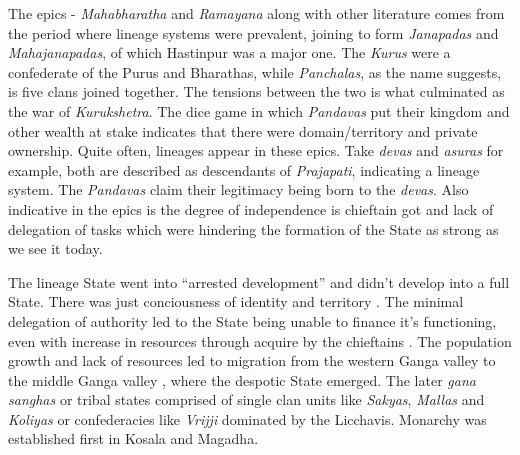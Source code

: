 \documentclass[a4paper]{article}
\begin{document}
The epics - \textit{Mahabharatha} and \textit{Ramayana} along with other
literature comes from the period where lineage systems were prevalent,
joining to form \textit{Janapadas} and \textit{Mahajanapadas}, of which
Hastinpur was a major one.  The \textit{Kurus} were a confederate of the
Purus and Bharathas, while \textit{Panchalas}, as the name suggests, is
five clans joined together.  The tensions between the two is what
culminated as the war of \textit{Kurukshetra}. The dice game in which
\textit{Pandavas} put their kingdom and other wealth at stake indicates
that there were domain/territory and private ownership. Quite often,
lineages appear in these epics. Take \textit{devas} and \textit{asuras}
for example, both are described as descendants of \textit{Prajapati},
indicating a lineage system. The \textit{Pandavas} claim their
legitimacy being born to the \textit{devas}. Also indicative in the
epics is the degree of independence is chieftain got and lack of
delegation of tasks which were hindering the formation of the State as
strong as we see it today.

The lineage State went into ``arrested development'' \cite[p.
67]{thapar1984lineage} and didn't develop into a full State. There was
just conciousness of identity and territory \cite[p.
67]{thapar1984lineage}.  The minimal delegation of authority led to the
State being unable to finance it's functioning, even with increase in
resources through acquire by the chieftains \cite[p.
67]{thapar1984lineage} . The population growth and lack of resources led
to migration from the western Ganga valley to the middle Ganga valley
\cite[p. 77]{thapar1984lineage}, where the despotic State emerged. 
The later \textit{gana sanghas} or tribal states comprised of single
clan units like \textit{Sakyas}, \textit{Mallas} and \textit{Koliyas} or
confederacies like \textit{Vrijji} dominated by the {Licchavis}.
Monarchy was established first in Kosala and Magadha. 
\end{document}
